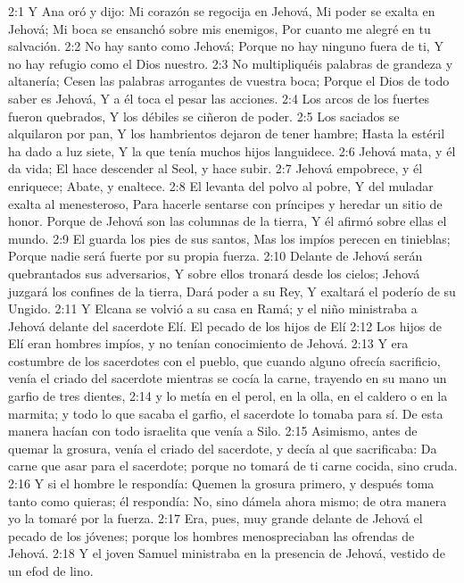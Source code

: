 2:1 Y Ana oró y dijo:  
Mi corazón se regocija en Jehová,  
Mi poder se exalta en Jehová;  
Mi boca se ensanchó sobre mis enemigos,  
Por cuanto me alegré en tu salvación.  
2:2 No hay santo como Jehová;  
Porque no hay ninguno fuera de ti,  
Y no hay refugio como el Dios nuestro.  
2:3 No multipliquéis palabras de grandeza y altanería; 
Cesen las palabras arrogantes de vuestra boca;  
Porque el Dios de todo saber es Jehová,  
Y a él toca el pesar las acciones. 
2:4 Los arcos de los fuertes fueron quebrados,  
Y los débiles se ciñeron de poder.  
2:5 Los saciados se alquilaron por pan,  
Y los hambrientos dejaron de tener hambre;  
Hasta la estéril ha dado a luz siete,  
Y la que tenía muchos hijos languidece.  
2:6 Jehová mata, y él da vida;  
El hace descender al Seol, y hace subir. 
2:7 Jehová empobrece, y él enriquece;  
Abate, y enaltece.  
2:8 El levanta del polvo al pobre,  
Y del muladar exalta al menesteroso,  
Para hacerle sentarse con príncipes y heredar un sitio de honor.  
Porque de Jehová son las columnas de la tierra,  
Y él afirmó sobre ellas el mundo.  
2:9 El guarda los pies de sus santos,  
Mas los impíos perecen en tinieblas;  
Porque nadie será fuerte por su propia fuerza.  
2:10 Delante de Jehová serán quebrantados sus adversarios,  
Y sobre ellos tronará desde los cielos;  
Jehová juzgará los confines de la tierra,  
Dará poder a su Rey,  
Y exaltará el poderío de su Ungido. 
2:11 Y Elcana se volvió a su casa en Ramá; y el niño ministraba a Jehová delante del sacerdote Elí.  
El pecado de los hijos de Elí  
2:12 Los hijos de Elí eran hombres impíos, y no tenían conocimiento de Jehová.  
2:13 Y era costumbre de los sacerdotes con el pueblo, que cuando alguno ofrecía sacrificio, venía el criado del sacerdote mientras se cocía la carne, trayendo en su mano un garfio de tres dientes,  
2:14 y lo metía en el perol, en la olla, en el caldero o en la marmita; y todo lo que sacaba el garfio, el sacerdote lo tomaba para sí. De esta manera hacían con todo israelita que venía a Silo.  
2:15 Asimismo, antes de quemar la grosura, venía el criado del sacerdote, y decía al que sacrificaba: Da carne que asar para el sacerdote; porque no tomará de ti carne cocida, sino cruda.  
2:16 Y si el hombre le respondía: Quemen la grosura primero, y después toma tanto como quieras; él respondía: No, sino dámela ahora mismo; de otra manera yo la tomaré por la fuerza.  
2:17 Era, pues, muy grande delante de Jehová el pecado de los jóvenes; porque los hombres menospreciaban las ofrendas de Jehová.  
2:18 Y el joven Samuel ministraba en la presencia de Jehová, vestido de un efod de lino.  
